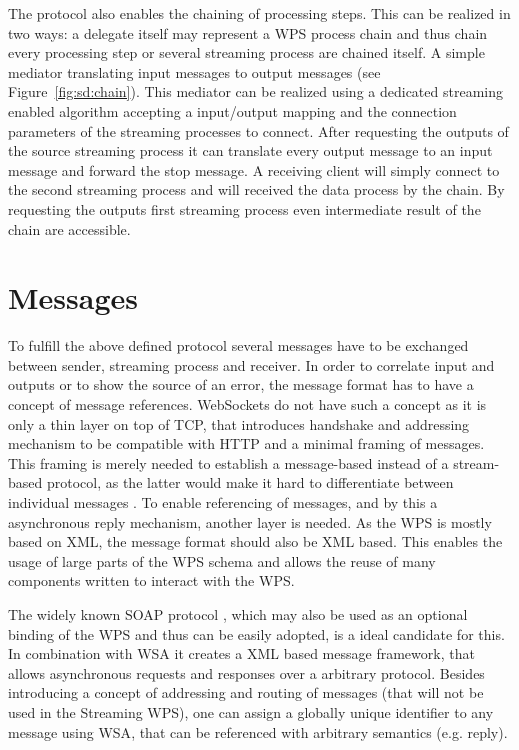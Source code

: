 	The protocol also enables the chaining of processing steps. This can be realized in two ways: a delegate itself may represent a \ac{WPS} process chain and thus chain every processing step or several streaming process are chained itself. A simple mediator translating input messages to output messages (see Figure~\ref{fig:sd:chain}). This mediator can be realized using a dedicated streaming enabled algorithm accepting a input/output mapping and the connection parameters of the streaming processes to connect. After requesting the outputs of the source streaming process it can translate every output message to an input message and forward the stop message. A receiving client will simply connect to the second streaming process and will received the data process by the chain. By requesting the outputs first streaming process even intermediate result of the chain are accessible.

	\section{Messages}
		\label{sec:streaming:messages}
		To fulfill the above defined protocol several messages have to be exchanged between sender, streaming process and receiver. In order to correlate input and outputs or to show the source of an error, the message format has to have a concept of message references. WebSockets do not have such a concept as it is only a thin layer on top of TCP, that introduces handshake and addressing mechanism to be compatible with HTTP and a minimal framing of messages. This framing is merely needed to establish a message-based instead of a stream-based protocol, as the latter would make it hard to differentiate between individual messages \citep{ietf:rfc6455}. To enable referencing of messages, and by this a asynchronous reply mechanism, another layer is needed. As the \ac{WPS} is mostly based on \ac{XML}, the message format should also be \ac{XML} based. This enables the usage of large parts of the \ac{WPS} schema and allows the reuse of many components written to interact with the \ac{WPS}.

		The widely known SOAP protocol \citep{w3c:soap1}, which may also be used as an optional binding of the \ac{WPS} and thus can be easily adopted, is a ideal candidate for this. In combination with \ac{WSA} \citep{w3c:wsa} it creates a \ac{XML} based message framework, that allows asynchronous requests and responses over a arbitrary protocol. Besides introducing a concept of addressing and routing of messages (that will not be used in the Streaming \ac{WPS}), one can assign a globally unique identifier to any message using \ac{WSA}, that can be referenced with arbitrary semantics (e.g. reply).

